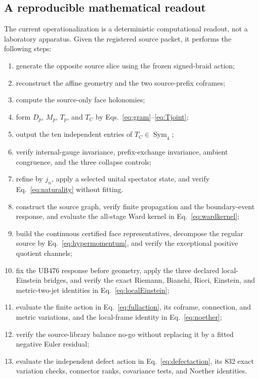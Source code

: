 \documentclass[11pt]{article}
\theoremstyle{definition}
\theoremstyle{remark}
\newcommand{\Sym}{\operatorname{Sym}}
\begin{document}
\subsection{A reproducible mathematical readout}

The current operationalization is a deterministic computational readout, not a laboratory apparatus. Given the registered source packet, it performs the following steps:
\begin{enumerate}
\item generate the opposite source slice using the frozen signed-braid action;
\item reconstruct the affine geometry and the two source-prefix coframes;
\item compute the source-only face holonomies;
\item form $D_p$, $M_p$, $T_p$, and $T_C$ by Eqs.~\eqref{eq:gram}--\eqref{eq:Tjoint};
\item output the ten independent entries of $T_C\in\Sym_4$;
\item verify internal-gauge invariance, prefix-exchange invariance, ambient congruence, and the three collapse controls;
\item refine by $j_n$, apply a selected unital spectator state, and verify Eq.~\eqref{eq:naturality} without fitting.
\item construct the source graph, verify finite propagation and the boundary-event response, and evaluate the all-stage Ward kernel in Eq.~\eqref{eq:wardkernel};
\item build the continuous certified face representatives, decompose the regular source by Eq.~\eqref{eq:hypermomentum}, and verify the exceptional positive quotient channels;
\item fix the UB476 response before geometry, apply the three declared local-Einstein bridges, and verify the exact Riemann, Bianchi, Ricci, Einstein, and metric-two-jet identities in Eq.~\eqref{eq:localEinstein};
\item evaluate the finite action in Eq.~\eqref{eq:fullaction}, its coframe, connection, and metric variations, and the local-frame identity in Eq.~\eqref{eq:noether};
\item verify the source-library balance no-go without replacing it by a fitted negative Euler residual;
\item evaluate the independent defect action in Eq.~\eqref{eq:defectaction}, its 832 exact variation checks, connector ranks, covariance tests, and Noether identities.
\end{enumerate}
\end{document}

